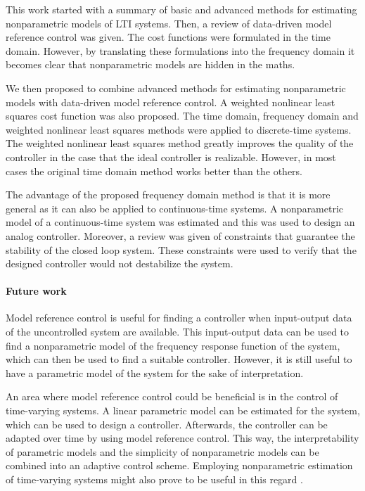 This work started with a summary of basic and advanced methods for estimating nonparametric models of LTI systems. Then, a review of data-driven model reference control was given. The cost functions were formulated in the time domain. However, by translating these formulations into the frequency domain it becomes clear that nonparametric models are hidden in the maths.

We then proposed to combine advanced methods for estimating nonparametric models with data-driven model reference control. A weighted nonlinear least squares cost function was also proposed. The time domain, frequency domain and weighted nonlinear least squares methods were applied to discrete-time systems. The weighted nonlinear least squares method greatly improves the quality of the controller in the case that the ideal controller is realizable. However, in most cases the original time domain method works better than the others.

The advantage of the proposed frequency domain method is that it is more general as it can also be applied to continuous-time systems. A nonparametric model of a continuous-time system was estimated and this was used to design an analog controller. Moreover, a review was given of constraints that guarantee the stability of the closed loop system. These constraints were used to verify that the designed controller would not destabilize the system.

\paragraph{Future work}
Model reference control is useful for finding a controller when input-output data of the uncontrolled system are available. This input-output data can be used to find a nonparametric model of the frequency response function of the system, which can then be used to find a suitable controller. However, it is still useful to have a parametric model of the system for the sake of interpretation.

An area where model reference control could be beneficial is in the control of time-varying systems. A linear parametric model can be estimated for the system, which can be used to design a controller. Afterwards, the controller can be adapted over time by using model reference control. This way, the interpretability of parametric models and the simplicity of nonparametric models can be combined into an adaptive control scheme. Employing nonparametric estimation of time-varying systems might also prove to be useful in this regard \cite{Lataire_time-varying}.


